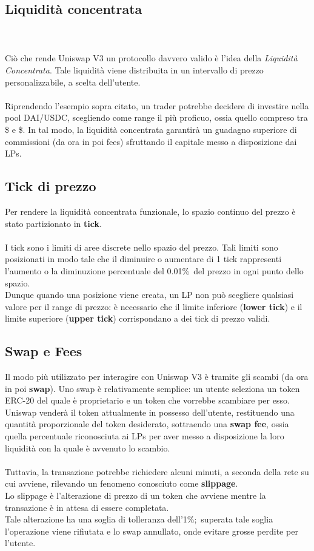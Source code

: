 \documentclass[12pt,a4paper]{report}
\begin{document}
\subsection{Liquidità concentrata}
\\\\Ciò che rende Uniswap V3 un protocollo davvero valido è l'idea della \textit{Liquidità Concentrata}\cite{concentrated_liquidity}. Tale liquidità viene distribuita in un intervallo di prezzo personalizzabile, a scelta dell'utente.
\\\\Riprendendo l'esempio sopra citato, un trader potrebbe decidere di investire nella pool DAI/USDC, scegliendo come range il più proficuo, ossia quello compreso tra \$ e \$.
In tal modo, la liquidità concentrata garantirà un guadagno superiore di commissioni (da ora in poi fees) sfruttando il capitale messo a disposizione dai LPs.

\subsection{Tick di prezzo}

Per rendere la liquidità concentrata funzionale, lo spazio continuo del prezzo è stato partizionato in \textbf{tick}.
\\\\I tick sono i limiti di aree discrete nello spazio del prezzo. Tali limiti sono posizionati in modo tale che il diminuire o aumentare di 1 tick rappresenti l'aumento o la diminuzione percentuale del 0.01\%\ del prezzo in ogni punto dello spazio.
\\Dunque quando una posizione viene creata, un LP non può scegliere qualsiasi valore per il range di prezzo: è necessario che il limite inferiore (\textbf{lower tick}) e il limite superiore (\textbf{upper tick}) corrispondano a dei tick di prezzo validi.

\subsection{Swap e Fees}

Il modo più utilizzato per interagire con Uniswap V3 è tramite gli scambi (da ora in poi \textbf{swap}).
Uno swap è relativamente semplice: un utente seleziona un token ERC-20 del quale è proprietario e un token che vorrebbe scambiare per esso. Uniswap venderà il token attualmente in possesso dell'utente, restituendo una quantità proporzionale del token desiderato, sottraendo una \textbf{swap fee}, ossia quella percentuale riconosciuta ai LPs per aver messo a disposizione la loro liquidità con la quale è avvenuto lo scambio.
\\\\Tuttavia, la transazione potrebbe richiedere alcuni minuti, a seconda della rete su cui avviene, rilevando un fenomeno conosciuto come \textbf{slippage}.
\\Lo slippage è l'alterazione di prezzo di un token che avviene mentre la transazione è in attesa di essere completata.\\Tale alterazione ha una soglia di tolleranza dell'1\%;\ superata tale soglia l'operazione viene rifiutata e lo swap annullato, onde evitare grosse perdite per l'utente.
\end{document}
